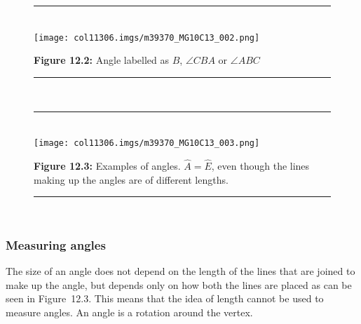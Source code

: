 	\begin{figure}[H] %
    \begin{center}
    \rule[.1in]{\figurerulewidth}{.005in} \\
        \label{m39370*uid9!!!underscore!!!media}\label{m39370*uid9!!!underscore!!!printimage}\texttt{[image: col11306.imgs/m39370\_MG10C13\_002.png]} %
      \vspace{2pt}
    \vspace{\rubberspace}\par \begin{cnxcaption}
	  \small \textbf{Figure 12.2: }Angle labelled as $\hat{B}$, $\angle CBA$\hspace{1ex} or $\angle ABC$
	\end{cnxcaption}
    \vspace{.1in}
    \rule[.1in]{\figurerulewidth}{.005in} \\
    \end{center}
 \end{figure}       
    \setcounter{subfigure}{0}
	\begin{figure}[H] %
    \begin{center}
    \rule[.1in]{\figurerulewidth}{.005in} \\
        \label{m39370*uid10!!!underscore!!!media}\label{m39370*uid10!!!underscore!!!printimage}\texttt{[image: col11306.imgs/m39370\_MG10C13\_003.png]} %
      \vspace{2pt}
    \vspace{\rubberspace}\par \begin{cnxcaption}
	  \small \textbf{Figure 12.3: }Examples of angles. $\hat{A}=\hat{E}$, even though the lines making up the angles are of different lengths.
	\end{cnxcaption}
    \vspace{.1in}
    \rule[.1in]{\figurerulewidth}{.005in} \\
    \end{center}
 \end{figure}       
      \label{m39370*uid11}
            \subsubsection{ Measuring angles}
            \nopagebreak
        \label{m39370*id314363}The size of an angle does not depend on the length of the lines that are joined to make up the angle, but depends only on how both the lines are placed as can be seen in Figure~12.3. This means that the idea of length cannot be used to measure angles. An angle is a rotation around the vertex.\par 
        \label{m39370*uid12}
